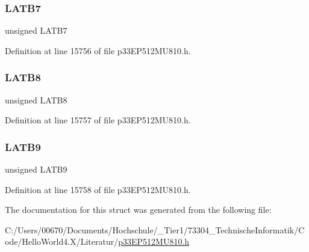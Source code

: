 \subsubsection{\texorpdfstring{L\+A\+T\+B7}{LATB7}}
{\footnotesize\ttfamily unsigned L\+A\+T\+B7}



Definition at line 15756 of file p33\+E\+P512\+M\+U810.\+h.

\mbox{\label{structtag_l_a_t_b_b_i_t_s_a6798ae40359a5a4891be047d25f7957b}} 
\subsubsection{\texorpdfstring{L\+A\+T\+B8}{LATB8}}
{\footnotesize\ttfamily unsigned L\+A\+T\+B8}



Definition at line 15757 of file p33\+E\+P512\+M\+U810.\+h.

\mbox{\label{structtag_l_a_t_b_b_i_t_s_ac3e16d6704a2e96592d8764e96c46839}} 
\subsubsection{\texorpdfstring{L\+A\+T\+B9}{LATB9}}
{\footnotesize\ttfamily unsigned L\+A\+T\+B9}



Definition at line 15758 of file p33\+E\+P512\+M\+U810.\+h.



The documentation for this struct was generated from the following file\+:\begin{DoxyCompactItemize}
\item 
C\+:/\+Users/00670/\+Documents/\+Hochschule/\+\_\+\+Tier1/73304\+\_\+\+Technische\+Informatik/\+Code/\+Hello\+World4.\+X/\+Literatur/\hyperlink{p33_e_p512_m_u810_8h}{p33\+E\+P512\+M\+U810.\+h}\end{DoxyCompactItemize}
